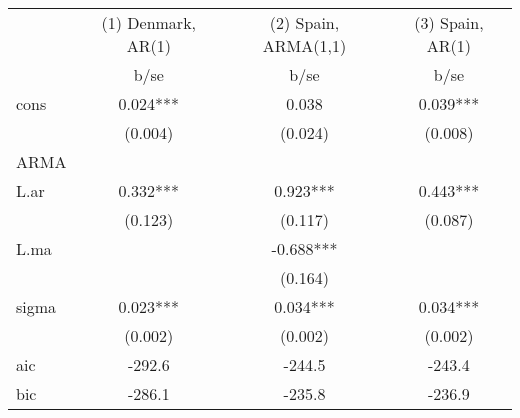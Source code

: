 \begin{tabular}{lccc}\toprule
            &(1) Denmark, AR(1)   &(2) Spain, ARMA(1,1)   &(3) Spain, AR(1)   \\
            &        b/se   &        b/se   &        b/se   \\
\midrule
cons       &       0.024***&       0.038   &       0.039***\\
            &     (0.004)   &     (0.024)   &     (0.008)   \\
\midrule
ARMA        &               &               &               \\
L.ar        &       0.332***&       0.923***&       0.443***\\
            &     (0.123)   &     (0.117)   &     (0.087)   \\
L.ma        &               &      -0.688***&               \\
            &               &     (0.164)   &               \\
\midrule
sigma       &       0.023***&       0.034***&       0.034***\\
            &     (0.002)   &     (0.002)   &     (0.002)   \\
\midrule
aic         &      -292.6   &      -244.5   &      -243.4   \\
bic         &      -286.1   &      -235.8   &      -236.9   \\
\bottomrule \end{tabular} \\ 
